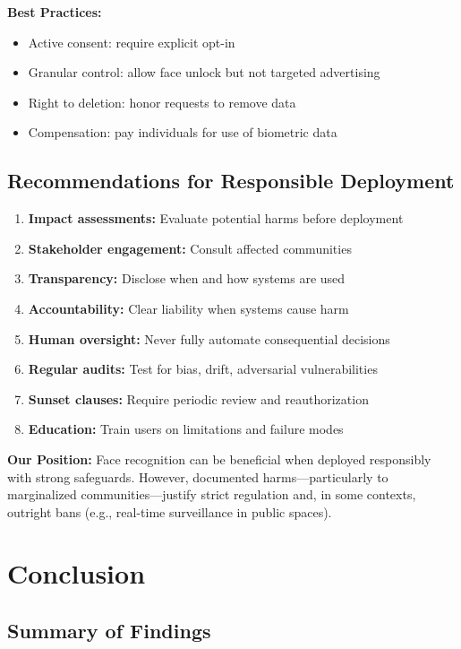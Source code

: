 \documentclass[11pt,a4paper]{article}
\begin{document}
\textbf{Best Practices:}
\begin{itemize}
    \item Active consent: require explicit opt-in
    \item Granular control: allow face unlock but not targeted advertising
    \item Right to deletion: honor requests to remove data
    \item Compensation: pay individuals for use of biometric data
\end{itemize}

\subsection{Recommendations for Responsible Deployment}

\begin{enumerate}
    \item \textbf{Impact assessments:} Evaluate potential harms before deployment
    \item \textbf{Stakeholder engagement:} Consult affected communities
    \item \textbf{Transparency:} Disclose when and how systems are used
    \item \textbf{Accountability:} Clear liability when systems cause harm
    \item \textbf{Human oversight:} Never fully automate consequential decisions
    \item \textbf{Regular audits:} Test for bias, drift, adversarial vulnerabilities
    \item \textbf{Sunset clauses:} Require periodic review and reauthorization
    \item \textbf{Education:} Train users on limitations and failure modes
\end{enumerate}

\textbf{Our Position:} Face recognition can be beneficial when deployed responsibly with strong safeguards. However, documented harms—particularly to marginalized communities—justify strict regulation and, in some contexts, outright bans (e.g., real-time surveillance in public spaces).

\section{Conclusion}

\subsection{Summary of Findings}
\end{document}
